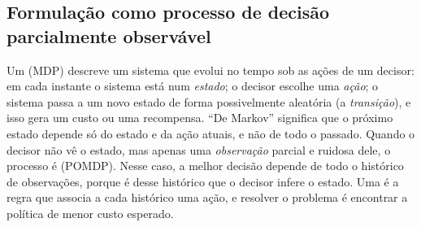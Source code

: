 \subsection{Formulação como processo de decisão parcialmente observável}
Um  (MDP) descreve um sistema que evolui no tempo sob as ações de um decisor: em
cada instante o sistema está num \emph{estado}; o decisor escolhe uma \emph{ação}; o sistema passa a um novo estado de
forma possivelmente aleatória (a \emph{transição}), e isso gera um custo ou uma recompensa. ``De Markov'' significa que o
próximo estado depende só do estado e da ação atuais, e não de todo o passado. Quando o decisor não vê o estado, mas
apenas uma \emph{observação} parcial e ruidosa dele, o processo é  (POMDP). Nesse caso, a
melhor decisão depende de todo o histórico de observações, porque é desse histórico que o decisor infere o estado. Uma
 é a regra que associa a cada histórico uma ação, e resolver o problema é encontrar a política de menor
custo esperado.

